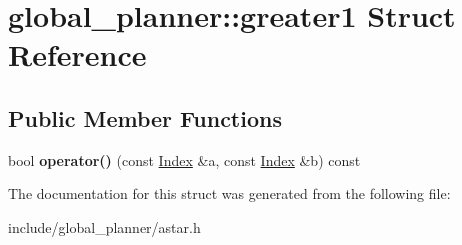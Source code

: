 \hypertarget{structglobal__planner_1_1greater1}{}\section{global\+\_\+planner\+:\+:greater1 Struct Reference}
\label{structglobal__planner_1_1greater1}
\subsection*{Public Member Functions}
\begin{DoxyCompactItemize}
\item 
\mbox{\label{structglobal__planner_1_1greater1_a8efdd33231191d4b1178fa16f49eaf17}} 
bool {\bfseries operator()} (const \mbox{\hyperlink{classglobal__planner_1_1_index}{Index}} \&a, const \mbox{\hyperlink{classglobal__planner_1_1_index}{Index}} \&b) const
\end{DoxyCompactItemize}


The documentation for this struct was generated from the following file\+:\begin{DoxyCompactItemize}
\item 
include/global\+\_\+planner/astar.\+h\end{DoxyCompactItemize}
